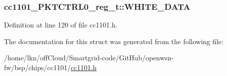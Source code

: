\subsubsection[{\texorpdfstring{W\+H\+I\+T\+E\+\_\+\+D\+A\+TA}{WHITE_DATA}}]{ cc1101\+\_\+\+P\+K\+T\+C\+T\+R\+L0\+\_\+reg\+\_\+t\+::\+W\+H\+I\+T\+E\+\_\+\+D\+A\+TA}\hypertarget{structcc1101___p_k_t_c_t_r_l0__reg__t_a1ba08c7554f828c59c48933c13e23726}{}\label{structcc1101___p_k_t_c_t_r_l0__reg__t_a1ba08c7554f828c59c48933c13e23726}


Definition at line 120 of file cc1101.\+h.



The documentation for this struct was generated from the following file\+:\begin{DoxyCompactItemize}
\item 
/home/lkn/off\+Cloud/\+Smartgrid-\/code/\+Git\+Hub/openwsn-\/fw/bsp/chips/cc1101/\hyperlink{cc1101_8h}{cc1101.\+h}\end{DoxyCompactItemize}
